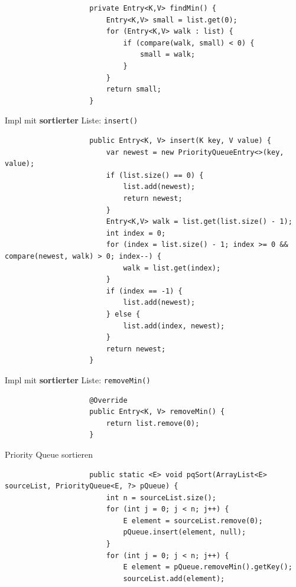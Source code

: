 \documentclass[a4paper, landscape, 8pt]{scrartcl}
\begin{document}
\begin{multicols*}{4}
\begin{lstlisting}
                    private Entry<K,V> findMin() {
                        Entry<K,V> small = list.get(0);
                        for (Entry<K,V> walk : list) {
                            if (compare(walk, small) < 0) {
                                small = walk;
                            }
                        }
                        return small;
                    }
                \end{lstlisting}
                \textcolor{subsectioncolor}{Impl mit {\bfseries sortierter} Liste: \texttt{insert()}}
                \begin{lstlisting}
                    public Entry<K, V> insert(K key, V value) {
                        var newest = new PriorityQueueEntry<>(key, value);
                        if (list.size() == 0) {
                            list.add(newest);
                            return newest;
                        }
                        Entry<K,V> walk = list.get(list.size() - 1);
                        int index = 0;
                        for (index = list.size() - 1; index >= 0 && compare(newest, walk) > 0; index--) {
                            walk = list.get(index);
                        }
                        if (index == -1) {
                            list.add(newest);
                        } else {
                            list.add(index, newest);
                        }
                        return newest;
                    }
                \end{lstlisting}
                \textcolor{subsectioncolor}{Impl mit {\bfseries sortierter} Liste: \texttt{removeMin()}}
                \begin{lstlisting}
                    @Override
                    public Entry<K, V> removeMin() {
                        return list.remove(0);
                    }
                \end{lstlisting}
                \textcolor{subsectioncolor}{Priority Queue sortieren}
                \begin{lstlisting}
                    public static <E> void pqSort(ArrayList<E> sourceList, PriorityQueue<E, ?> pQueue) {
                        int n = sourceList.size();
                        for (int j = 0; j < n; j++) {
                            E element = sourceList.remove(0);
                            pQueue.insert(element, null);
                        }
                        for (int j = 0; j < n; j++) {
                            E element = pQueue.removeMin().getKey();
                            sourceList.add(element);

\end{lstlisting}
\end{multicols*}
\end{document}
